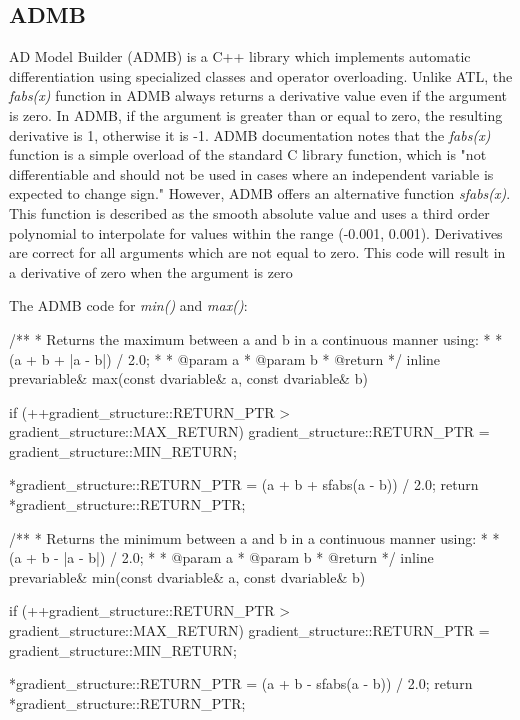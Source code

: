 \documentclass[oneside]{article}
\begin{document}
\subsection{ADMB}

AD Model Builder (ADMB) is a C++ library which implements automatic differentiation using specialized classes and operator overloading. \cite{ admb} Unlike ATL, the \textit{fabs(x)} function in ADMB always returns a derivative value even if the argument is zero. In ADMB, if the argument is greater than or equal to zero, the resulting derivative is 1, otherwise it is -1. ADMB documentation notes that the \textit{fabs(x)} function is a simple overload of the standard C library function, which is "not differentiable and should not be used in cases where an independent variable is expected to change sign." However, ADMB offers an alternative function \textit{sfabs(x)}. This function is described as the smooth absolute value and uses a third order polynomial to interpolate for values within the range (-0.001, 0.001). Derivatives are correct for all arguments which are not equal to zero. This code will result in a derivative of zero when the argument is zero

The ADMB code for \textit{min()} and \textit{max()}:

\begin{cppsource}

/**
 * Returns the maximum between a and b in a continuous manner using:
 *
 * (a + b + |a - b|) / 2.0;
 *
 * @param a
 * @param b
 * @return
 */
inline prevariable& max(const dvariable& a, const dvariable& b) {
    if (++gradient_structure::RETURN_PTR > gradient_structure::MAX_RETURN)
        gradient_structure::RETURN_PTR = gradient_structure::MIN_RETURN;

    *gradient_structure::RETURN_PTR = (a + b + sfabs(a - b)) / 2.0;
    return *gradient_structure::RETURN_PTR;
}


/**
 * Returns the minimum between a and b in a continuous manner using:
 *
 * (a + b - |a - b|) / 2.0;
 *
 * @param a
 * @param b
 * @return
 */
inline prevariable& min(const dvariable& a, const dvariable& b) {
    if (++gradient_structure::RETURN_PTR > gradient_structure::MAX_RETURN)
        gradient_structure::RETURN_PTR = gradient_structure::MIN_RETURN;

    *gradient_structure::RETURN_PTR = (a + b - sfabs(a - b)) / 2.0;
    return *gradient_structure::RETURN_PTR;
}

\end{cppsource}
\end{document}
